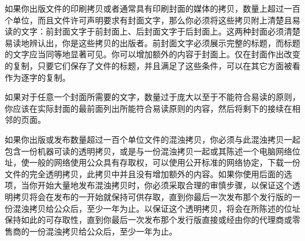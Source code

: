 如果你出版文件的印刷拷贝或者通常具有印刷封面的媒体的拷贝，数量上超过一百个单位，而且文件许可声明要求有封面文字，那么你必须将这些拷贝附上清楚且易读的文字：前封面文字于前封面上、后封面文字于后封面上。这两种封面必须清楚易读地辨认出，你是这些拷贝的出版者。前封面文字必须展示完整的标题，而标题的文字应当同等地显著可见。你可以增加额外的内容于封面上。仅在封面作出改变的复制，只要它们保存了文件的标题，并且满足了这些条件，可以在其它方面被看作为逐字的复制。


如果对于任意一个封面所需要的文字，数量过于庞大以至于不能符合易读的原则，你应该在实际封面的最前面列出所能符合易读原则的内容，然后将剩下的接续在相邻的页面。


如果你出版或发布数量超过一百个单位文件的混浊拷贝，你必须与此混浊拷贝一起包含一份机器可读的透明拷贝，或是与一份混浊拷贝一起或其陈述一个电脑网络位址，使一般的网络使用公众具有存取权，可以使用公开标准的网络协定，下载一份文件的完全透明拷贝，此拷贝中并且没有增加额外的内容。如果你使用后面的选项，当你开始大量地发布混浊拷贝时，你必须采取合理的审慎步骤，以保证这个透明拷贝将会在发布的一开始就保持可供存取，直到你最后一次发布那个发行版的一份混浊拷贝给公众后，至少一年为止。以保证这个透明拷贝，将会在所陈述的位址保持如此的可存取性，直到你最后一次发布那个发行版直接或经由你的代理商或零售商的一份混浊拷贝给公众后，至少一年为止。


